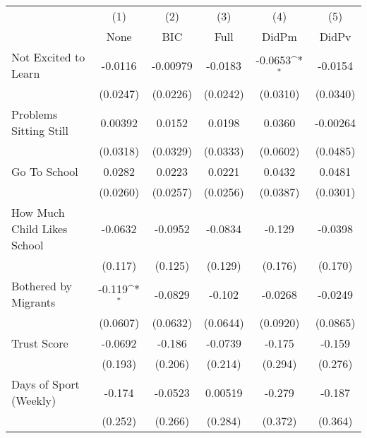 {
\def\sym#1{\ifmmode^{#1}\else\(^{#1}\)\fi}
\begin{tabular}{l*{5}{c}}
\toprule
            &\multicolumn{1}{c}{(1)}&\multicolumn{1}{c}{(2)}&\multicolumn{1}{c}{(3)}&\multicolumn{1}{c}{(4)}&\multicolumn{1}{c}{(5)}\\
            &\multicolumn{1}{c}{None}&\multicolumn{1}{c}{BIC}&\multicolumn{1}{c}{Full}&\multicolumn{1}{c}{DidPm}&\multicolumn{1}{c}{DidPv}\\
\midrule
Not Excited to Learn&     -0.0116         &    -0.00979         &     -0.0183         &     -0.0653\sym{*}  &     -0.0154         \\
            &    (0.0247)         &    (0.0226)         &    (0.0242)         &    (0.0310)         &    (0.0340)         \\
\addlinespace
Problems Sitting Still&     0.00392         &      0.0152         &      0.0198         &      0.0360         &    -0.00264         \\
            &    (0.0318)         &    (0.0329)         &    (0.0333)         &    (0.0602)         &    (0.0485)         \\
\addlinespace
Go To School&      0.0282         &      0.0223         &      0.0221         &      0.0432         &      0.0481         \\
            &    (0.0260)         &    (0.0257)         &    (0.0256)         &    (0.0387)         &    (0.0301)         \\
\addlinespace
How Much Child Likes School&     -0.0632         &     -0.0952         &     -0.0834         &      -0.129         &     -0.0398         \\
            &     (0.117)         &     (0.125)         &     (0.129)         &     (0.176)         &     (0.170)         \\
\addlinespace
Bothered by Migrants&      -0.119\sym{*}  &     -0.0829         &      -0.102         &     -0.0268         &     -0.0249         \\
            &    (0.0607)         &    (0.0632)         &    (0.0644)         &    (0.0920)         &    (0.0865)         \\
\addlinespace
Trust Score &     -0.0692         &      -0.186         &     -0.0739         &      -0.175         &      -0.159         \\
            &     (0.193)         &     (0.206)         &     (0.214)         &     (0.294)         &     (0.276)         \\
\addlinespace
Days of Sport (Weekly)&      -0.174         &     -0.0523         &     0.00519         &      -0.279         &      -0.187         \\
            &     (0.252)         &     (0.266)         &     (0.284)         &     (0.372)         &     (0.364)         \\
\bottomrule
\end{tabular}
}
